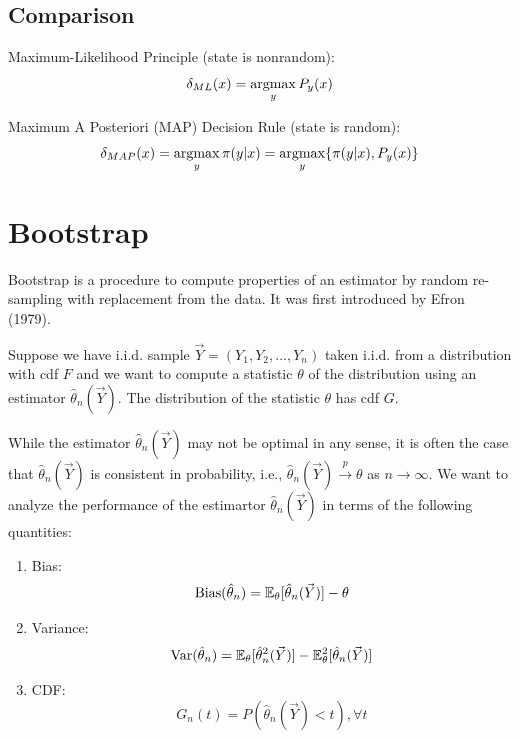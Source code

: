 \documentclass[11pt]{elegantbook}
\newcommand{\argmax}{\operatornamewithlimits{argmax}}
\begin{document}
\section{Comparison}
Maximum-Likelihood Principle (state is nonrandom): $$\delta_{ML}(x)=\argmax_y P_y(x)$$

Maximum A Posteriori (MAP) Decision Rule (state is random): $$\delta_{MAP}(x)=\argmax_y \pi(y|x)=\argmax_y \{\pi(y|x),P_y(x)\}$$



\chapter{Bootstrap}
Bootstrap is a procedure to compute properties of an estimator by random re-sampling with replacement from the data. It was first introduced by Efron (1979).

Suppose we have i.i.d. sample $\vec{Y}=(Y_1,Y_2,...,Y_n)$ taken i.i.d. from a distribution with cdf $F$ and we want to compute a statistic $\theta$ of the distribution using an estimator $\hat{\theta}_n(\vec{Y})$. The distribution of the statistic $\theta$ has cdf $G$.

While the estimator $\hat{\theta}_n(\vec{Y})$ may not be optimal in any sense, it is often the case that $\hat{\theta}_n(\vec{Y})$ is consistent in probability, i.e., $\hat{\theta}_n(\vec{Y}) \stackrel{p}{\longrightarrow} \theta$ as $n \rightarrow \infty$. We want to analyze the performance of the estimartor $\hat{\theta}_n(\vec{Y})$ in terms of the following quantities:
\begin{enumerate}[(1).]
    \item Bias: $$\textnormal{Bias}(\hat{\theta}_n)= \mathbb{E}_{\theta}[\hat{\theta}_n(\vec{Y})]-\theta$$
    \item Variance: $$\textnormal{Var}(\hat{\theta}_n)=\mathbb{E}_{\theta}[\hat{\theta}_n^2(\vec{Y})]-\mathbb{E}_{\theta}^2[\hat{\theta}_n(\vec{Y})]$$
    \item CDF: $$G_{n}(t)=P(\hat{\theta}_n(\vec{Y})<t),\forall t$$
\end{enumerate}
\end{document}
